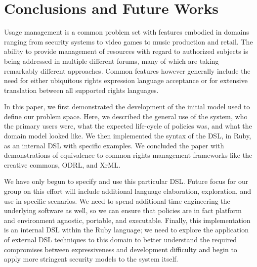 \section{Conclusions and Future Works}
Usage management is a common problem set with features embodied in domains ranging from security systems to video games to music production and retail.  The ability to provide management of resources with regard to authorized subjects is being addressed in multiple different forums, many of which are taking remarkably different approaches.  Common features however generally include the need for either ubiquitous rights expression language acceptance or for extensive translation between all supported rights languages.

In this paper, we first demonstrated the development of the initial model used to define our problem space.  Here, we described the general use of the system, who the primary users were, what the expected life-cycle of policies was, and what the domain model looked like.  We then implemented the syntax of the DSL, in Ruby, as an internal DSL with specific examples.  We concluded the paper with demonstrations of equivalence to common rights management frameworks like the creative commons, ODRL, and XrML.

We have only begun to specify and use this particular DSL.  Future focus for our group on this effort will include additional language elaboration, exploration, and use in specific scenarios.  We need to spend additional time engineering the underlying software as well, so we can ensure that policies are in fact platform and environment agnostic, portable, and executable.  Finally, this implementation is an internal DSL within the Ruby language; we need to explore the application of external DSL techniques to this domain to better understand the required compromises between expressiveness and development difficulty and begin to apply more stringent security models to the system itself.